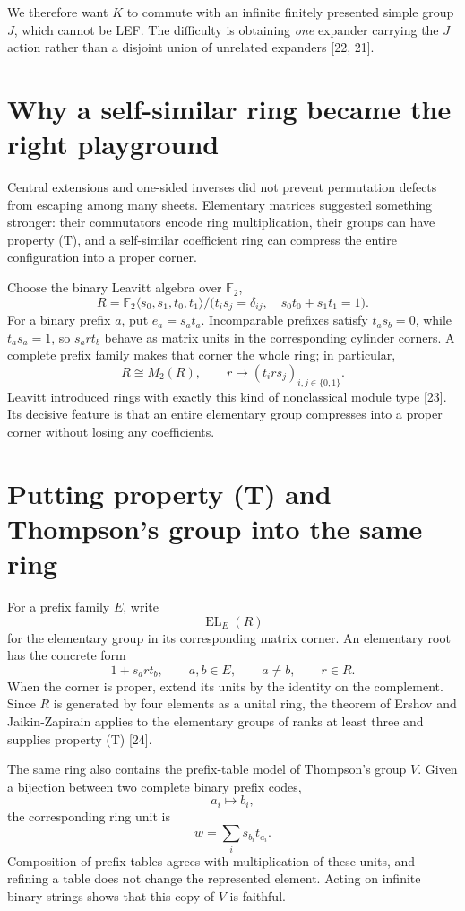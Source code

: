 \documentclass[10pt,openany]{book}
\newcommand{\refnum}[1]{\textnormal{[#1]}}
\newcommand{\EL}{\operatorname{EL}}
\begin{document}
We therefore want $K$ to commute with an infinite finitely presented simple group $J$, which cannot be LEF\@. The difficulty is obtaining \emph{one} expander carrying the $J$ action rather than a disjoint union of unrelated expanders \refnum{22, 21}.

\section{Why a self-similar ring became the right playground}

Central extensions and one-sided inverses did not prevent permutation defects from escaping among many sheets. Elementary matrices suggested something stronger: their commutators encode ring multiplication, their groups can have property (T), and a self-similar coefficient ring can compress the entire configuration into a proper corner.

Choose the binary Leavitt algebra over $\mathbb{F}_2$,
\[
 R=\mathbb{F}_2\langle s_0,s_1,t_0,t_1\rangle/
 \bigl(t_i s_j=\delta_{ij},\quad s_0t_0+s_1t_1=1\bigr).
\]
For a binary prefix $a$, put $e_a=s_at_a$. Incomparable prefixes satisfy $t_as_b=0$, while $t_as_a=1$, so $s_art_b$ behave as matrix units in the corresponding cylinder corners. A complete prefix family makes that corner the whole ring; in particular,
\[
 R\cong M_2(R),
 \qquad
 r\longmapsto (t_i r s_j)_{i,j\in\{0,1\}}.
\]
Leavitt introduced rings with exactly this kind of nonclassical module type \refnum{23}. Its decisive feature is that an entire elementary group compresses into a proper corner without losing any coefficients.

\section{Putting property (T) and Thompson's group into the same ring}

For a prefix family $E$, write
\[
 \EL_E(R)
\]
for the elementary group in its corresponding matrix corner. An elementary root has the concrete form
\[
 1+s_art_b,
 \qquad
 a,b\in E,
 \qquad
 a\ne b,
 \qquad
 r\in R.
\]
When the corner is proper, extend its units by the identity on the complement. Since $R$ is generated by four elements as a unital ring, the theorem of Ershov and Jaikin-Zapirain applies to the elementary groups of ranks at least three and supplies property (T) \refnum{24}.

The same ring also contains the prefix-table model of Thompson's group $V$. Given a bijection between two complete binary prefix codes,
\[
 a_i\longmapsto b_i,
\]
the corresponding ring unit is
\[
 w=\sum_i s_{b_i}t_{a_i}.
\]
Composition of prefix tables agrees with multiplication of these units, and refining a table does not change the represented element. Acting on infinite binary strings shows that this copy of $V$ is faithful.
\end{document}

